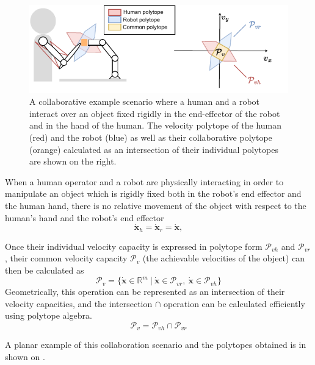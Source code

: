 \begin{figure}[!h]
    \centering
    \includegraphics[width=0.7\linewidth]{Chapters/imgs/velocity_collab.pdf}
    \caption{A collaborative example scenario where a human and a robot interact over an object fixed rigidly in the end-effector of the robot and in the hand of the human. The velocity polytope of the human (red) and the robot (blue) as well as their collaborative polytope (orange) calculated as an intersection of their individual polytopes are shown on the right.}
    \label{fig:collaboration_vel}
\end{figure}

When a human operator and a robot are physically interacting in order to manipulate an object which is rigidly fixed both in the robot's end effector and the human hand, there is no relative movement of the object with respect to the human's hand and the robot's end effector
\begin{equation}
    \dot{\bm{x}}_h=\dot{\bm{x}}_r=\dot{\bm{x}},
\end{equation}

Once their individual velocity capacity is expressed in polytope form $\mathcal{P}_{vh}$ and $\mathcal{P}_{vr}$, their common velocity capacity $\mathcal{P}_v$ (the achievable velocities of the object) can then be calculated as 
\begin{equation}
    \mathcal{P}_v = \{\dot{\bm{x}}\in \mathbb{R}^m ~|~ \dot{\bm{x}} \in \mathcal{P}_{vr},~\dot{\bm{x}} \in \mathcal{P}_{vh}\}
\end{equation}
Geometrically, this operation can be represented as an intersection of their velocity capacities, and the intersection $\cap$ operation can be calculated efficiently using polytope algebra. 
\begin{equation}
    \mathcal{P}_v =  \mathcal{P}_{vh} \cap \mathcal{P}_{vr}
\end{equation}

A planar example of this collaboration scenario and the polytopes obtained is in shown on . 



